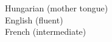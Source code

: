 \documentclass{xetexCV}
\begin{document}
Hungarian (mother tongue) \\ 
English (fluent) \\ 
French (intermediate)

%
%

\newpage
\nocite{*}

\end{document}
